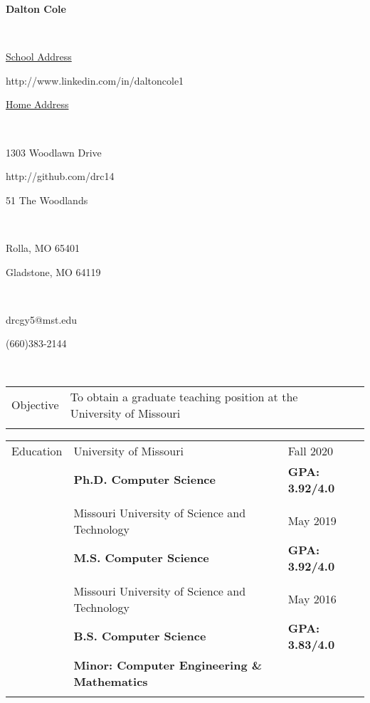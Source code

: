 \documentclass[10.5pt, arial]{article}
\newcommand\textbox[1]{%
  \parbox{.333\textwidth}{#1}%
}
\begin{document}

\noindent\textbox{\hfill}\textbox{\hfil \textbf{Dalton Cole}\hfil}\textbox{\hfill} \\
\noindent\textbox{\underline{School Address}\hfill}\textbox{\hfil http://www.linkedin.com/in/daltoncole1\hfil}\textbox{\hfill \underline{Home Address}} \\
\noindent\textbox{1303 Woodlawn Drive\hfill}\textbox{\hfil http://github.com/drc14\hfil}\textbox{\hfill 51 The Woodlands} \\
\noindent\textbox{Rolla, MO 65401\hfill}\textbox{\hfil \hfil}\textbox{\hfill Gladstone, MO 64119} \\
\noindent\textbox{drcgy5@mst.edu\hfill}\textbox{\hfil \hfil}\textbox{\hfill (660)383-2144} \\
\noindent\makebox[\linewidth]{\rule{\textwidth}{.4pt}} 

\begin{tabular}{p{1.5cm} p{13.2cm} l}
Objective  	& To obtain a graduate teaching position at the University of Missouri		 & 						\\ \\
\end{tabular}

\begin{tabular}{p{1.5cm} p{13.2cm} l}
Education  	& University of Missouri						 					& Fall 2020 				\\
			& \textbf{Ph.D. Computer Science} 									& \textbf{GPA: 3.92/4.0}	\\ \\

			& Missouri University of Science and Technology 					& May 2019 				\\
			& \textbf{M.S. Computer Science}									& \textbf{GPA: 3.92/4.0}	\\ \\

		  	& Missouri University of Science and Technology 					& May 2016 				\\
			& \textbf{B.S. Computer Science} 									& \textbf{GPA: 3.83/4.0} \\
			& \textbf{Minor: Computer Engineering \& Mathematics} 										\\ \\
\end{tabular}
\end{document}
